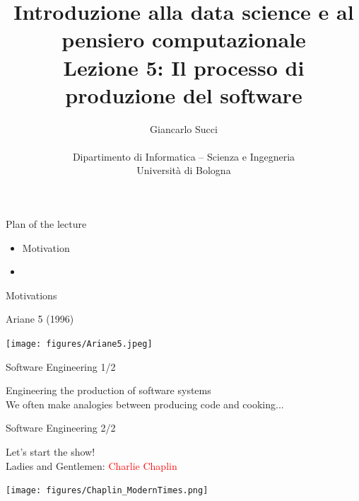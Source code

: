 \documentclass{beamer}
\title[L02]{Introduzione alla data science e al pensiero computazionale\\
Lezione 5: Il processo di produzione del software} %
\author[{\tiny Giancarlo Succi }]{Giancarlo Succi\\\\ Dipartimento di Informatica -- Scienza e Ingegneria\\Universit\`{a} di Bologna\\
\bftt{g.succi@unibo.it}
} %
\institute[unibo] %
\date{} %
\begin{document}
\begin{frame}
\titlepage %

\end{frame}




\begin{frame}
{\centerline{Plan of the lecture}}
\begin{itemize}
    \item Motivation
    \item 
\end{itemize} 
\end{frame}

\begin{frame}{\centerline{Motivations}}
\begin{center}
{\Large
Ariane 5 (1996)\\
}
\end{center}
\begin{center}
\texttt{[image: figures/Ariane5.jpeg]}
\end{center}

\end{frame}



\begin{frame}{\centerline{Software Engineering 1/2}}
\begin{center}
{\Large
Engineering the production of software systems\\
}
\vspace{2cm}
We often make analogies between producing code and cooking...
\end{center}
\end{frame}

\begin{frame}{\centerline{Software Engineering 2/2}}
\begin{center}
\Large
Let's start the show!\\
\vspace*{0.5cm}
Ladies and Gentlemen: \textcolor{red}{Charlie Chaplin}
\end{center}
\begin{center}
\texttt{[image: figures/Chaplin\_ModernTimes.png]}
\end{center}

\end{frame}
\end{document}
